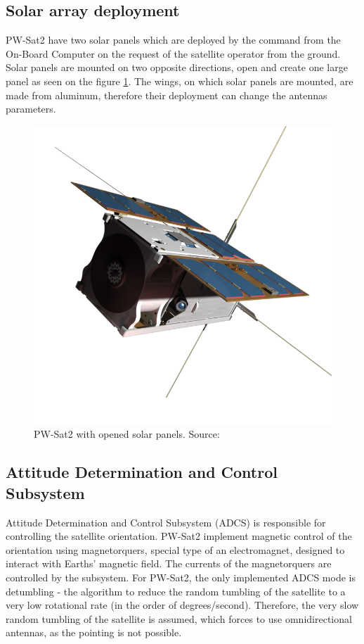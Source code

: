 \subsection{Solar array deployment}
PW-Sat2 have two solar panels which are deployed by the command from the On-Board Computer on the request of the satellite operator from the ground. Solar panels are mounted on two opposite directions, open and create one large panel as seen on the figure \ref{PW-Sat_solar_panels}. The wings, on which solar panels are mounted, are made from aluminum, therefore their deployment can change the antennas parameters.
\begin{figure}
    \centering
    \includegraphics[width=0.38\paperwidth]{img/1/pwsat_solar_panels.png}
    \caption{PW-Sat2 with opened solar panels. Source: \cite{PW_sat2_photo}}
    \label{PW-Sat_solar_panels}
\end{figure}

\subsection{Attitude Determination and Control Subsystem}
Attitude Determination and Control Subsystem (ADCS) is responsible for controlling the satellite orientation. PW-Sat2 implement magnetic control of the orientation using magnetorquers, special type of an electromagnet, designed to interact with Earths' magnetic field. The currents of the magnetorquers are controlled by the subsystem. For PW-Sat2, the only implemented ADCS mode is detumbling - the algorithm to reduce the random tumbling of the satellite to a very low rotational rate (in the order of degrees/second). Therefore, the very slow random tumbling of the satellite is assumed, which forces to use omnidirectional antennas, as the pointing is not possible.

